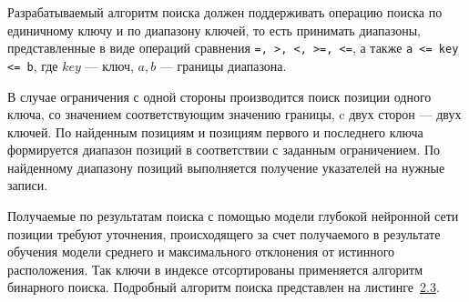 
Разрабатываемый алгоритм поиска должен поддерживать операцию поиска по
единичному ключу и по диапазону ключей, то есть принимать диапазоны,
представленные в виде операций сравнения \texttt{=, >, <, >=, <=}, а также
\mbox{\texttt{a <= key <= b}}, где $key$ --- ключ, $a, b$ --- границы диапазона.

В случае ограничения с одной стороны производится поиск позиции одного ключа, со
значением соответствующим значению границы, c двух сторон --- двух ключей.  По
найденным позициям и позициям первого и последнего ключа формируется диапазон
позиций в соответствии с заданным ограничением. По найденному диапазону позиций
выполняется получение указателей на нужные записи.

Получаемые по результатам поиска с помощью модели глубокой нейронной сети
позиции требуют уточнения, происходящего за счет получаемого в результате
обучения модели среднего и максимального отклонения от истинного расположения.
Так ключи в индексе отсортированы применяется алгоритм бинарного поиска.
Подробный алгоритм поиска представлен на листинге~\hyperref[alg:search]{2.3}.
\vspace{0.2cm}

